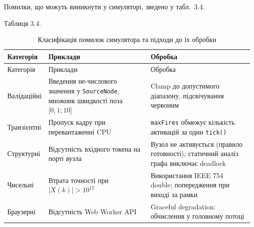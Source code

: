 \documentclass[
]{article}
\begin{document}
Помилки, що можуть виникнути у симуляторі, зведено у табл.~3.4.

Таблиця 3.4.

\begin{longtable}[]{@{}
  >{\raggedright\arraybackslash}p{}
  >{\raggedright\arraybackslash}p{}
  >{\raggedright\arraybackslash}p{}@{}}
\caption{Класифікація помилок симулятора та підходи до їх
обробки}\tabularnewline
\toprule\noalign{}
\begin{minipage}[b]{\linewidth}\raggedright
Категорія
\end{minipage} & \begin{minipage}[b]{\linewidth}\raggedright
Приклади
\end{minipage} & \begin{minipage}[b]{\linewidth}\raggedright
Обробка
\end{minipage} \\
\midrule\noalign{}
\endfirsthead
\toprule\noalign{}
\begin{minipage}[b]{\linewidth}\raggedright
Категорія
\end{minipage} & \begin{minipage}[b]{\linewidth}\raggedright
Приклади
\end{minipage} & \begin{minipage}[b]{\linewidth}\raggedright
Обробка
\end{minipage} \\
\midrule\noalign{}
\endhead
\bottomrule\noalign{}
\endlastfoot
Валідаційні & Введення не-числового значення у \texttt{SourceNode},
множник швидкості поза \(\lbrack 0,1;10\rbrack\) & Clamp до допустимого
діапазону, підсвічування червоним \\
Транзієнтні & Пропуск кадру при перевантаженні CPU & \texttt{maxFires}
обмежує кількість активацій за один \texttt{tick}\texttt{()} \\
Структурні & Відсутність вхідного токена на порті вузла & Вузол не
активується (правило готовності); статичний аналіз графа виключає
deadlock \\
Чисельні & Втрата точності при \(|X(k)| > 10^{12}\) & Використання IEEE
754 double; попередження при виході за рамки \\
Браузерні & Відсутність Web Worker API & Graceful degradation:
обчислення у головному потоці \\
\end{longtable}
\end{document}
